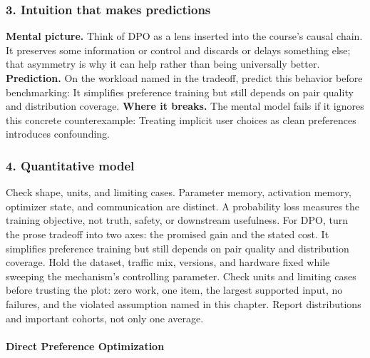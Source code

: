 \subsubsection*{3. Intuition that makes predictions}
\textbf{Mental picture.} Think of DPO as a lens inserted into the course's causal chain. It preserves some information or control and discards or delays something else; that asymmetry is why it can help rather than being universally better.
\textbf{Prediction.} On the workload named in the tradeoff, predict this behavior before benchmarking: It simplifies preference training but still depends on pair quality and distribution coverage.
\textbf{Where it breaks.} The mental model fails if it ignores this concrete counterexample: Treating implicit user choices as clean preferences introduces confounding.
\subsubsection*{4. Quantitative model}
Check shape, units, and limiting cases. Parameter memory, activation memory, optimizer state, and communication are distinct. A probability loss measures the training objective, not truth, safety, or downstream usefulness.
For DPO, turn the prose tradeoff into two axes: the promised gain and the stated cost. It simplifies preference training but still depends on pair quality and distribution coverage. Hold the dataset, traffic mix, versions, and hardware fixed while sweeping the mechanism's controlling parameter.
Check units and limiting cases before trusting the plot: zero work, one item, the largest supported input, no failures, and the violated assumption named in this chapter. Report distributions and important cohorts, not only one average.
\paragraph{Direct Preference Optimization}
